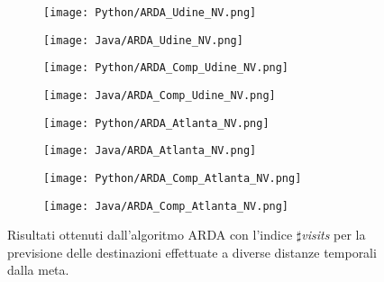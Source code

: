 \begin{figure}[!ht]
    \begin{center}
    \begin{subfigure}[a.1]{0.45\textwidth}
        \texttt{[image: Python/ARDA\_Udine\_NV.png]} \caption{}
    \end{subfigure}
    \begin{subfigure}[a.2]{0.45\textwidth}
        \texttt{[image: Java/ARDA\_Udine\_NV.png]} \caption{}
    \end{subfigure}
    \begin{subfigure}[b.1]{0.45\textwidth}
        \texttt{[image: Python/ARDA\_Comp\_Udine\_NV.png]} \caption{}
    \end{subfigure}
    \begin{subfigure}[b.2]{0.45\textwidth}
        \texttt{[image: Java/ARDA\_Comp\_Udine\_NV.png]} \caption{}
    \end{subfigure}
    \begin{subfigure}[c.1]{0.45\textwidth}
        \texttt{[image: Python/ARDA\_Atlanta\_NV.png]} \caption{}
    \end{subfigure}
    \begin{subfigure}[c.2]{0.45\textwidth}
        \texttt{[image: Java/ARDA\_Atlanta\_NV.png]} \caption{}
    \end{subfigure}
    \begin{subfigure}[d.1]{0.45\textwidth}
        \texttt{[image: Python/ARDA\_Comp\_Atlanta\_NV.png]} \caption{}
    \end{subfigure}
    \begin{subfigure}[d.2]{0.45\textwidth}
        \texttt{[image: Java/ARDA\_Comp\_Atlanta\_NV.png]} \caption{}
    \end{subfigure}
    \caption[ARDA_1_NV]{
        Risultati ottenuti dall'algoritmo ARDA con l'indice $\sharp$\textit{visits} per la
        previsione delle destinazioni effettuate a diverse distanze temporali dalla meta.
    }
    \label{etichetta}
    \end{center}
\end{figure}

